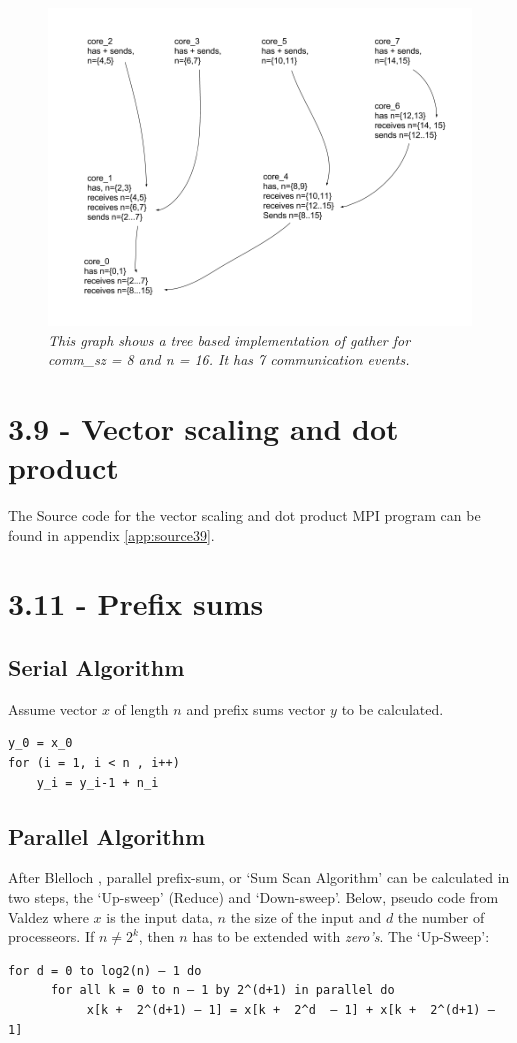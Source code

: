 \documentclass[a4paper,11pt,twoside]{article}
\begin{document}
\begin{figure}

  \centering
  \includegraphics[width=1\textwidth]{gather.png}
  \caption{\textit{This graph shows a tree based implementation of gather for comm\_sz = 8 and n = 16. It has 7 communication events.}}
  \label{fig:gather}
\end{figure}

\section{3.9 - Vector scaling and dot product}
The Source code for the vector scaling and dot product MPI program can be found in appendix \ref{app:source39}.


\section{3.11 - Prefix sums}
\subsection*{Serial Algorithm}
Assume vector $x$ of length $n$ and prefix sums vector $y$ to be calculated.
\begin{verbatim}
y_0 = x_0
for (i = 1, i < n , i++)
    y_i = y_i-1 + n_i
\end{verbatim}

\subsection*{Parallel Algorithm}
After Blelloch \cite{blelloch1990}, parallel prefix-sum, or `Sum Scan Algorithm' can be calculated in two steps, the `Up-sweep' (Reduce) and `Down-sweep'. Below, pseudo code from Valdez \cite{valdez2012} where $x$ is the input data, $n$ the size of the input and $d$ the number of processeors. If $n \neq 2^{k}$, then $n$ has to be extended with \textit{zero's}. The `Up-Sweep':
\begin{verbatim}
for d = 0 to log2(n) – 1 do 
      for all k = 0 to n – 1 by 2^(d+1) in parallel do 
           x[k +  2^(d+1) – 1] = x[k +  2^d  – 1] + x[k +  2^(d+1) – 1]
\end{verbatim}
\end{document}

